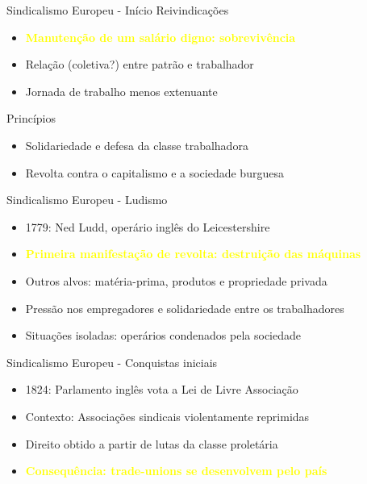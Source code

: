\begin{frame}{Sindicalismo Europeu - Início}
    Reivindicações
    \begin{itemize}
        \item \textbf{\textcolor{yellow}{Manutenção de um salário digno: sobrevivência}}
        \item Relação (coletiva?) entre patrão e trabalhador
        \item Jornada de trabalho menos extenuante
    \end{itemize}
    Princípios
    \begin{itemize}
        \item Solidariedade e defesa da classe trabalhadora
        \item Revolta contra o capitalismo e a sociedade burguesa
    \end{itemize}
\end{frame}

\begin{frame}{Sindicalismo Europeu - Ludismo}
    \begin{itemize}
        \item 1779: Ned Ludd, operário inglês do Leicestershire
        \item \textbf{\textcolor{yellow}{Primeira manifestação de revolta: destruição das máquinas}}
        \item Outros alvos: matéria-prima, produtos e propriedade privada
        \item Pressão nos empregadores e solidariedade entre os trabalhadores
        \item Situações isoladas: operários condenados pela sociedade
    \end{itemize}
\end{frame}

\begin{frame}{Sindicalismo Europeu - Conquistas iniciais}
    \begin{itemize}
        \item 1824: Parlamento inglês vota a Lei de Livre Associação
        \item Contexto: Associações sindicais violentamente reprimidas
        \item Direito obtido a partir de lutas da classe proletária
        \item \textbf{\textcolor{yellow}{Consequência: trade-unions se desenvolvem pelo país}}
    \end{itemize}
\end{frame}

